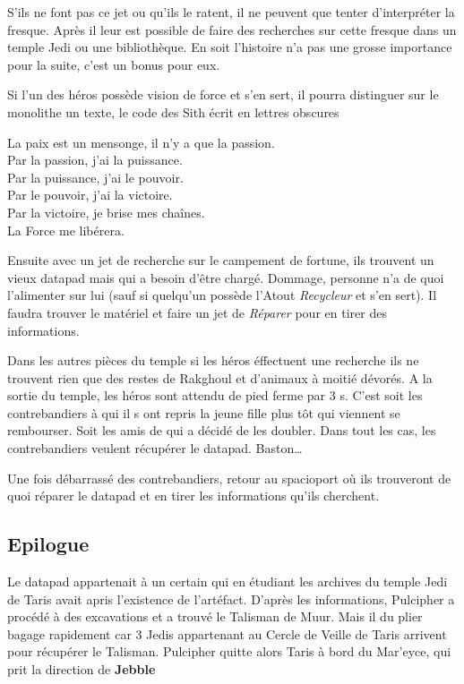 S’ils ne font pas ce jet ou qu’ils le ratent, il ne peuvent que tenter d’interpréter la fresque. Après il leur est possible de faire des recherches sur cette fresque dans un temple Jedi ou une bibliothèque. En soit l’histoire n’a pas une grosse importance pour la suite, c’est un bonus pour eux.

Si l’un des héros possède vision de force et s’en sert, il pourra distinguer sur le monolithe un texte, le code des Sith écrit en lettres obscures
\begin{quotebox}
La paix est un mensonge, il n’y a que la passion. \\
Par la passion, j’ai la puissance. \\
Par la puissance, j’ai le pouvoir. \\
Par le pouvoir, j’ai la victoire. \\
Par la victoire, je brise mes chaînes. \\
La Force me libérera.
\end{quotebox}

Ensuite avec un jet de recherche sur le campement de fortune, ils trouvent un vieux datapad mais qui a besoin d’être chargé. Dommage, personne n’a de quoi l’alimenter sur lui (sauf si quelqu’un possède l’Atout \emph{Recycleur} et s’en sert). Il faudra trouver le matériel et faire un jet de \emph{Réparer} pour en tirer des informations.

Dans les autres pièces du temple si les héros éffectuent une recherche ils ne trouvent rien que des restes de Rakghoul et d’animaux à moitié dévorés.
A la sortie du temple, les héros sont attendu de pied ferme par 3 s. C’est soit les contrebandiers à qui il s ont repris la jeune fille plus tôt qui viennent se rembourser. Soit les amis de  qui a décidé de les doubler. Dans tout les cas, les contrebandiers veulent récupérer le datapad. Baston\ldots

Une fois débarrassé des contrebandiers, retour au spacioport où ils trouveront de quoi réparer le datapad et en tirer les informations qu’ils cherchent.

\subsection{\’Epilogue}
Le datapad appartenait à un certain  qui en étudiant les archives du temple Jedi de Taris avait apris l’existence de l’artéfact. D’après les informations, Pulcipher a procédé à des excavations et a trouvé le Talisman de Muur. Mais il du plier bagage rapidement car 3 Jedis appartenant au Cercle de Veille de Taris arrivent pour récupérer le Talisman. Pulcipher quitte alors Taris à bord du Mar’eyce, qui prit la direction de \textbf{Jebble}


